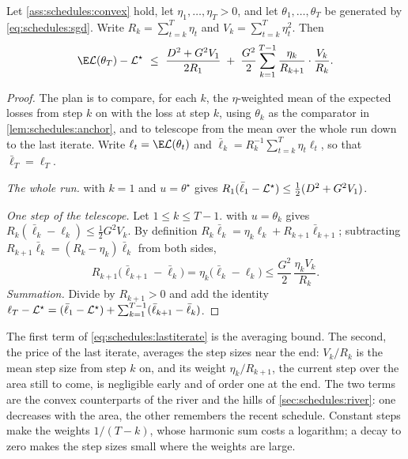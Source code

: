 \begin{refsection}
\begin{theorem}\label{thm:schedules:lastiterate}
Let \cref{ass:schedules:convex} hold, let $\eta_1,\dots,\eta_T>0$, and let $\theta_1,\dots,\theta_T$ be generated by \eqref{eq:schedules:sgd}. Write $R_k=\sum_{t=k}^{T}\eta_t$ and $V_k=\sum_{t=k}^{T}\eta_t^2$. Then
\begin{equation}\label{eq:schedules:lastiterate}
  \E\Loss(\theta_T)-\Loss^\star\ \le\ \frac{D^2+G^2V_1}{2R_1}\;+\;\frac{G^2}{2}\sum_{k=1}^{T-1}\frac{\eta_k}{R_{k+1}}\cdot\frac{V_k}{R_k} .
\end{equation}
\end{theorem}

\begin{proof}
The plan is to compare, for each $k$, the $\eta$-weighted mean of the expected losses from step $k$ on with the loss at step $k$, using $\theta_k$ as the comparator in \cref{lem:schedules:anchor}, and to telescope from the mean over the whole run down to the last iterate. Write $\ell_t=\E\Loss(\theta_t)$ and $\bar\ell_k=R_k^{-1}\sum_{t=k}^{T}\eta_t\ell_t$, so that $\bar\ell_T=\ell_T$.

\emph{The whole run.}  with $k=1$ and $u=\theta^\star$ gives $R_1(\bar\ell_1-\mathcal{L}^\star)\le\frac12(D^2+G^2V_1)$.

\emph{One step of the telescope.} Let $1\le k\le T-1$.  with $u=\theta_k$ gives $R_k(\bar\ell_k-\ell_k)\le\frac12G^2V_k$. By definition $R_k\bar\ell_k=\eta_k\ell_k+R_{k+1}\bar\ell_{k+1}$; subtracting $R_{k+1}\bar\ell_k=(R_k-\eta_k)\bar\ell_k$ from both sides,
\[
  R_{k+1}\bigl(\bar\ell_{k+1}-\bar\ell_k\bigr)=\eta_k\bigl(\bar\ell_k-\ell_k\bigr)\le\frac{G^2}2\,\frac{\eta_kV_k}{R_k} .
\]
\emph{Summation.} Divide by $R_{k+1}>0$ and add the identity $\ell_T-\mathcal{L}^\star=(\bar\ell_1-\mathcal{L}^\star)+\sum_{k=1}^{T-1}(\bar\ell_{k+1}-\bar\ell_k)$.
\end{proof}

The first term of \eqref{eq:schedules:lastiterate} is the averaging bound. The second, the price of the last iterate, averages the step sizes near the end: $V_k/R_k$ is the mean step size from step $k$ on, and its weight $\eta_k/R_{k+1}$, the current step over the area still to come, is negligible early and of order one at the end. The two terms are the convex counterparts of the river and the hills of \cref{sec:schedules:river}: one decreases with the area, the other remembers the recent schedule. Constant steps make the weights $1/(T-k)$, whose harmonic sum costs a logarithm; a decay to zero makes the step sizes small where the weights are large.


\end{refsection}
